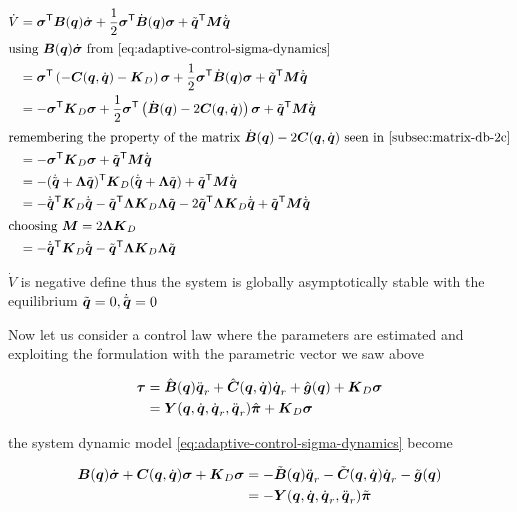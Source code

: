 \begin{align*}
    \dot{V} &= \vect\sigma^\trans \B(\q) \dot{\vect\sigma} + \frac{1}{2} \vect\sigma^\trans \dB(\q) \vect\sigma + \qe^\trans \matr M \dqe \\
    \intertext{using $\B(\q) \dot{\vect\sigma}$ from \autoref{eq:adaptive-control-sigma-dynamics}}
	&= \vect\sigma^\trans \left( - \matr{C}(\q,\dq)  - \K_D \right) \vect\sigma + \frac{1}{2} \vect\sigma^\trans \dB(\q) \vect\sigma + \qe^\trans \matr M \dqe \\
	&= - \vect\sigma^\trans \K_D \vect\sigma + \frac{1}{2} \vect\sigma^\trans \left( \dB(\q) - 2 \matr{C}(\q,\dq)\right) \vect\sigma + \qe^\trans \matr M \dqe \\
    \intertext{remembering the property of the matrix  $\dB(\q) - 2 \matr{C}(\q,\dq)$ seen in \autoref{subsec:matrix-db-2c}}
    &= - \vect\sigma^\trans \K_D \vect\sigma + \qe^\trans \matr M \dqe \\
	&= -(\dqe + \matr\Lambda\qe)^\trans \K_D (\dqe + \matr\Lambda\qe) + \qe^\trans \matr M \dqe \\
	&= - \dqe^\trans \K_D \dqe - \qe^\trans \matr\Lambda \K_D \matr\Lambda\qe - 2 \qe^\trans \matr\Lambda \K_D \dqe + \qe^\trans \matr M \dqe \\
	\intertext{choosing $\matr M = 2 \matr\Lambda \K_D$}
    &= - \dqe^\trans \K_D \dqe - \qe^\trans \matr\Lambda \K_D \matr\Lambda\qe \\
\end{align*}

$\dot{V}$ is negative define thus the system is globally asymptotically stable with the equilibrium $\tilde{\boldsymbol{q}} = 0, \dot{\tilde{\boldsymbol{q}}} = 0 $

Now let us consider a control law where the parameters are estimated and exploiting the formulation with the parametric vector we saw above

\begin{align*}
    \boldsymbol{\tau} &= \hat{\boldsymbol{B}}(\boldsymbol{q})\ddot{\boldsymbol{q}}_r + \hat{\boldsymbol{C}}(\boldsymbol{q},\dot{\boldsymbol{q}})\dot{\boldsymbol{q}}_r + \hat{\boldsymbol{g}}(\boldsymbol{q}) + \boldsymbol{K}_D\boldsymbol{\sigma} \\
    &= \boldsymbol{Y} (\boldsymbol{q},\dot{\boldsymbol{q}},\dot{\boldsymbol{q}}_r,\ddot{\boldsymbol{q}}_r)\hat{\boldsymbol{\pi}} + \boldsymbol{K}_D\boldsymbol{\sigma}
\end{align*}

the system dynamic model \autoref{eq:adaptive-control-sigma-dynamics} become

\begin{align*}
    \boldsymbol{B}(\boldsymbol{q}) \dot{\boldsymbol{\sigma}} + \boldsymbol{C}(\boldsymbol{q},\dot{\boldsymbol{q}}) \boldsymbol{\sigma} + \boldsymbol{K}_D \boldsymbol{\sigma} &=
    - \tilde{\boldsymbol{B}}(\boldsymbol{q}) \ddot{\boldsymbol{q}}_r - \tilde{\boldsymbol{C}}(\boldsymbol{q},\dot{\boldsymbol{q}}) \dot{\boldsymbol{q}}_r - \tilde{\boldsymbol{g}}(\boldsymbol{q}) \\
    &= - \boldsymbol{Y} (\boldsymbol{q},\dot{\boldsymbol{q}},\dot{\boldsymbol{q}}_r,\ddot{\boldsymbol{q}}_r)\tilde{\boldsymbol{\pi}}
\end{align*}

